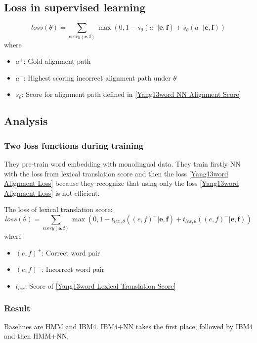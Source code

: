 \documentclass{article}
\begin{document}
\subsection{Loss in supervised learning}
\begin{equation}
loss(\theta) = \sum_{every(\textbf{e},\textbf{f})} \max(0 , 1 - s_{\theta}(a^+ |\textbf{e},\textbf{f}) + s_{\theta}(a^- |\textbf{e},\textbf{f}) )
\label{Yang13word Alignment Loss}
\end{equation}
where
\begin{itemize}
\item $a^+$: Gold alignment path
\item $a^-$: Highest scoring incorrect alignment path under $\theta$
\item $s_\theta$: Score for alignment path defined in \eqref{Yang13word NN Alignment Score}
\end{itemize}

\subsection{Analysis}
\subsubsection{Two loss functions during training}
They pre-train word embedding with monolingual data.
They train firstly NN with the loss from lexical translation score and then the loss \eqref{Yang13word Alignment Loss} because they recognize that using only the loss \eqref{Yang13word Alignment Loss} is not efficient.

The loss of lexical translation score:
\begin{equation}
loss(\theta) = \sum_{every(\textbf{e},\textbf{f})} \max(0 , 1 - t_{lex, \theta}((e,f)^+ | \textbf{e},\textbf{f}) + t_{lex, \theta}((e,f)^- | \textbf{e},\textbf{f}) )
\end{equation}
where
\begin{itemize}
\item $(e,f)^+$: Correct word pair
\item $(e,f)^-$: Incorrect word pair
\item $t_{lex}$: Score of \eqref{Yang13word Lexical Translation Score}
\end{itemize}

\subsubsection{Result}
Baselines are HMM and IBM4. IBM4+NN takes the first place, followed by IBM4 and then HMM+NN.
\end{document}
